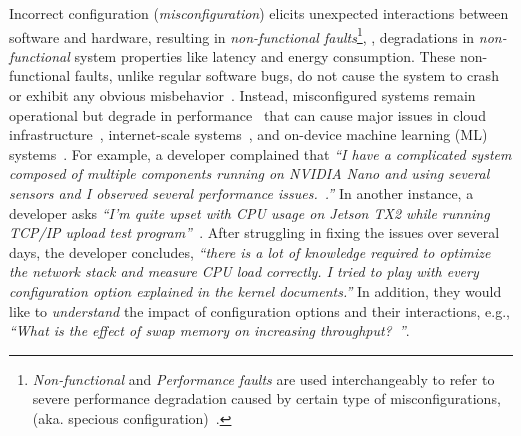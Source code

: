 Incorrect configuration (\textit{misconfiguration}) elicits unexpected interactions between software and hardware, resulting in \textit{non-functional faults}\footnote{ \emph{Non-functional} and \emph{Performance faults} are used interchangeably to refer to severe performance degradation caused by certain type of misconfigurations, (aka. specious configuration)~\cite{hu2020automated}.}, \ie, degradations in \textit{non-functional} system properties like latency and energy consumption. These non-functional faults, unlike regular software bugs, do not cause the system to crash or exhibit any obvious misbehavior~\cite{reddy2016fault, tsakiltsidis2016automatic, nistor2013discovering}. Instead, misconfigured systems remain operational but degrade in performance~\cite{bryant2003computer, molyneaux2009art,sanchez2020tandem,nistor2015caramel} that can cause major issues in cloud infrastructure~\cite{amazon:config:outage}, internet-scale systems~\cite{fb:config:outage}, and on-device machine learning (ML) systems~\cite{slowimag79:online}. For example, a developer complained that \textit{``I have a complicated system composed of multiple components running on NVIDIA Nano and using several sensors and I observed several performance issues.~\cite{super_frustrated_power_perf:online}.''} 
In another instance, a developer asks \textit{``I’m quite upset with CPU usage on Jetson TX2 while running TCP/IP upload test program''~\cite{HighCPUu7:online}}. 
After struggling in fixing the issues over several days, the developer concludes, \textit{``there is a lot of knowledge required to optimize the network stack and measure CPU load correctly. I tried to play with every configuration option explained in the kernel documents.''}
In addition, they would like to \emph{understand} the impact of configuration options and their interactions, e.g., \textit{``What is the effect of swap memory on increasing throughput?~\cite{slowimag79:online}''}. 


